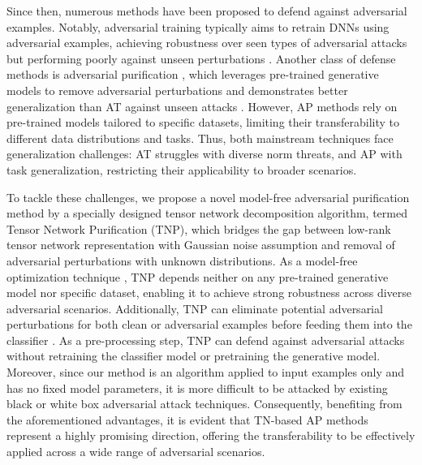 Since then, numerous methods have been proposed to defend against adversarial examples.
Notably, adversarial training \citep[AT,][]{goodfellow2014explaining} typically aims to retrain DNNs using adversarial examples, achieving robustness over seen types of adversarial attacks but performing poorly against unseen perturbations \citep{laidlaw2021perceptual,dolatabadi2022}.
Another class of defense methods is adversarial purification \citep[AP,][]{yoon2021adversarial}, which leverages pre-trained generative models to remove adversarial perturbations and demonstrates better generalization than AT against unseen attacks \citep{nie2022diffusion,lin2024adversarial}. However, AP methods rely on pre-trained models tailored to specific datasets, limiting their transferability to different data distributions and tasks.
Thus, both mainstream techniques face generalization challenges: AT struggles with diverse norm threats, and AP with task generalization, restricting their applicability to broader scenarios.

To tackle these challenges, we propose a novel model-free adversarial purification method by a specially designed tensor network decomposition algorithm, termed Tensor Network Purification (TNP), which bridges the gap between low-rank tensor network representation with Gaussian noise assumption and removal of adversarial perturbations with unknown distributions.
As a model-free optimization technique \citep{oseledets2011tensor,zhao2016tensor}, TNP depends neither on any pre-trained generative model nor specific dataset, enabling it to achieve strong robustness across diverse adversarial scenarios.
Additionally, TNP can eliminate potential adversarial perturbations for both clean or adversarial examples before feeding them into the classifier \citep{yoon2021adversarial}. As a pre-processing step, TNP can defend against adversarial attacks without retraining the classifier model or pretraining the generative model. Moreover, since our method is an algorithm applied to input examples only and has no fixed model parameters, it is more difficult to be attacked by existing black or white box adversarial attack techniques.
Consequently, benefiting from the aforementioned advantages, it is evident that TN-based AP methods represent a highly promising direction, offering the transferability to be effectively applied across a wide range of adversarial scenarios.

